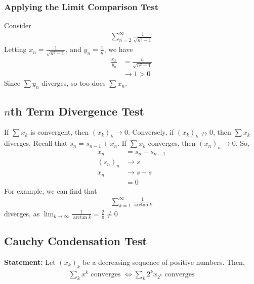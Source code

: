 \documentclass[10pt]{extarticle}
\begin{document}
    \subsubsection{Applying the Limit Comparison Test}%
      Consider
      \begin{align*}
        \sum_{n=2}^{\infty}\frac{1}{\sqrt{n^2 -1}}
      \end{align*}
      Letting $x_n = \frac{1}{\sqrt{n^2 - 1}}$, and $y_n = \frac{1}{n}$, we have
      \begin{align*}
        \frac{x_n}{y_n} &= \frac{n}{\sqrt{n^2 - 1}}\\
                        &\rightarrow 1 > 0
      \end{align*}
      Since $\sum y_n$ diverges, so too does $\sum x_n$.
  \subsection{$n$th Term Divergence Test}%
    If $\sum x_k$ is convergent, then $(x_k)_k \rightarrow 0$. Conversely, if $(x_k)_k \nrightarrow 0$, then $\sum x_k$ diverges.
    Recall that $s_n = s_{n-1} + x_n$. If $\sum x_k$ converges, then $(x_n)_n \rightarrow 0$. So,
    \begin{align*}
      x_n &= s_n - s_{n-1}\\
      (s_n)_n &\rightarrow s\\
      x_n &\rightarrow s - s\\
          &= 0
    \end{align*}
    For example, we can find that
    \begin{align*}
      \sum_{k=1}^{\infty}\frac{1}{\arctan{k}}
    \end{align*}
    diverges, as $\lim_{k\rightarrow\infty}\frac{1}{\arctan{k}} = \frac{2}{\pi} \neq 0$
  \subsection{Cauchy Condensation Test}%
  \textbf{Statement:} Let $(x_k)_k$ be a decreasing sequence of positive numbers. Then,
    \begin{align*}
      \sum_{k}x^k \text{ converges } \Leftrightarrow \sum_{k} 2^kx_{2^k} \text{ converges}
    \end{align*}
    
\end{document}
